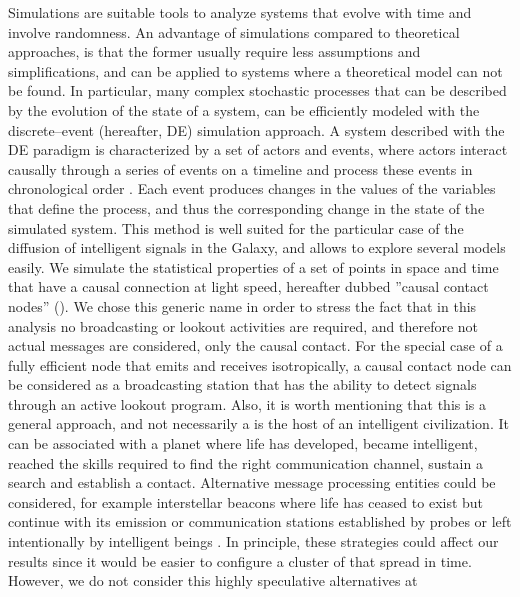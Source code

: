 Simulations are suitable tools to analyze systems that evolve with
time and involve randomness.
%
An advantage of simulations compared to theoretical approaches, is
that the former usually require less assumptions and simplifications,
and can be applied to systems where a theoretical model can not be
found.
%
In particular, many complex stochastic processes that can be described
by the evolution of the state of a system, can be efficiently modeled
with the discrete--event (hereafter, DE) simulation approach.
%
A system described with the DE paradigm is characterized by a set of
actors and events, where actors interact causally through a series of
events on a timeline and process these events in chronological order
\citep{ptolemaeus_system_2014, chung_simulation_2003,
ross_simulation_2012}.
%
Each event produces changes in the values of the variables that define
the process, and thus the corresponding change in the state of the
simulated system.
%
This method is well suited for the particular case of the diffusion of
intelligent signals in the Galaxy, and allows to explore several
models easily.
%
We simulate the statistical properties of a set of points in space and
time that have a causal connection
at light speed, hereafter dubbed ''causal contact nodes'' (\ceti).
%
%
We chose this generic name in order to stress the fact that in this
analysis no broadcasting or lookout activities are required, 
and therefore not actual messages are considered, only the causal
contact.
%
For the special case of a fully efficient node that emits
and receives isotropically, a causal contact node can be considered as
a broadcasting station that has the ability to detect signals through
an active lookout program.
%
Also, it is worth mentioning that this is a general approach, and not
necessarily a \ceti is the host of an intelligent civilization.
%
It can be associated with a planet where life has developed,
became intelligent, reached the skills required to find the right
communication channel, sustain a search and establish a contact.
%
Alternative message processing entities could be considered, for
example interstellar beacons where life has ceased to exist but
continue with its emission or communication stations established by
probes or left intentionally by intelligent beings \citep[see, e.g.,
][]{peters_outer_2018, barlow_galactic_2013}.
%
In principle, these strategies could affect our results since it would
be easier to configure a cluster of \cetis that spread in time.
%
However, we do not consider this highly speculative alternatives at
